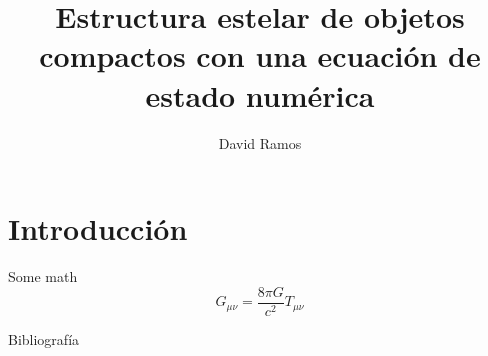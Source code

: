 \documentclass[11pt]{beamer}
\title[Estructura estelar de objetos compactos]{Estructura estelar de objetos compactos con una ecuación de estado numérica}
\author[David Ramos]{David Ramos}
\begin{document}
	\typesetFrontSlides

\section{Introducción}
\begin{frame}{Some math}
    \begin{equation}
        G_{\mu\nu}=\frac{8\pi G}{c^2} T_{\mu\nu}
    \end{equation}
\end{frame}


\begin{frame}{Bibliografía}

\end{frame}
\end{document}
